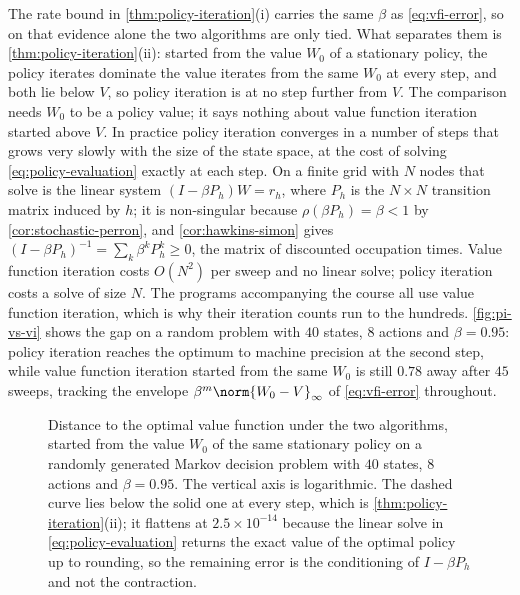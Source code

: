 \begin{remark}\label{rem:pi-vs-vi}
	The rate bound in \autoref{thm:policy-iteration}(i) carries the same $\beta$
	as \eqref{eq:vfi-error}, so on that evidence alone the two algorithms are
	only tied. What separates them is
	\autoref{thm:policy-iteration}(ii): started from the value $W_0$ of a
	stationary policy, the policy iterates dominate the value iterates from the
	same $W_0$ at every step, and both lie below $V$, so policy iteration is at
	no step further from $V$. The comparison needs $W_0$ to be a policy value; it
	says nothing about value function iteration started above $V$. In practice
	policy iteration converges in a number of steps that grows very slowly with
	the size of the state space, at the cost of solving
	\eqref{eq:policy-evaluation} exactly at each step. On a finite grid with
	$N$ nodes that solve is the linear system $(I-\beta P_{h})W=r_{h}$, where
	$P_{h}$ is the $N\times N$ transition matrix induced by $h$; it is non-singular
	because $\rho(\beta P_{h})=\beta<1$ by \autoref{cor:stochastic-perron}, and
	\autoref{cor:hawkins-simon} gives $(I-\beta P_{h})^{-1}=\sum_k\beta^{k}P_{h}^{k}
		\geq0$, the matrix of discounted occupation times. Value function iteration
	costs $O(N^{2})$ per sweep and no linear solve; policy iteration costs a solve
	of size $N$. The programs accompanying the course all use value function
	iteration, which is why their iteration counts run to the hundreds.
	\autoref{fig:pi-vs-vi} shows the gap on a random problem with $40$ states,
	$8$ actions and $\beta=0.95$: policy iteration reaches the optimum to machine
	precision at the second step, while value function iteration started from the
	same $W_0$ is still $0.78$ away after $45$ sweeps, tracking the envelope
	$\beta^{m}\norm{W_0-V}_\infty$ of \eqref{eq:vfi-error} throughout.
\end{remark}

\begin{figure}[htbp]
	\centering
	
	\caption[Policy iteration against value function iteration]{%
		Distance to the optimal value function under the two algorithms, started
		from the value $W_0$ of the same stationary policy on a randomly generated
		Markov decision problem with $40$ states, $8$ actions and $\beta=0.95$.
		The vertical axis is logarithmic. The dashed curve lies below the solid
		one at every step, which is
		\autoref{thm:policy-iteration}(ii); it flattens at $2.5\times10^{-14}$
		because the linear solve in \eqref{eq:policy-evaluation} returns the exact
		value of the optimal policy up to rounding, so the remaining error is the
		conditioning of $I-\beta P_{h}$ and not the contraction.}
	\label{fig:pi-vs-vi}
\end{figure}

